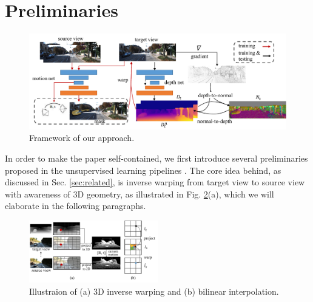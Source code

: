 \vspace{-0\baselineskip}
\section{Preliminaries}
\label{sec:preliminaries}
\vspace{-0\baselineskip}



\begin{figure}[!htp]
\centering
\includegraphics[width=\textwidth]{figures/pipeline_comp.pdf}
\caption{Framework of our approach.}
\label{fig:pipeline}
\vspace{-.3\baselineskip}
\end{figure}

In order to make the paper self-contained, we first introduce several preliminaries proposed in the unsupervised learning pipelines \cite{zhou2017unsupervised,godard2016unsupervised}. The core idea behind, as discussed in Sec. \ref{sec:related}, is inverse warping from target view to source view with awareness of 3D geometry, as illustrated in Fig. \ref{fig:3d_warping}(a), which we will elaborate in the following paragraphs.

\begin{figure}[!htp]
\centering
\includegraphics[width=0.5\textwidth]{figures/3d_warping_comp.pdf}
\caption{Illustraion of (a) 3D inverse warping and (b) bilinear interpolation.}
\label{fig:3d_warping}
\vspace{-1.1\baselineskip}
\end{figure}



